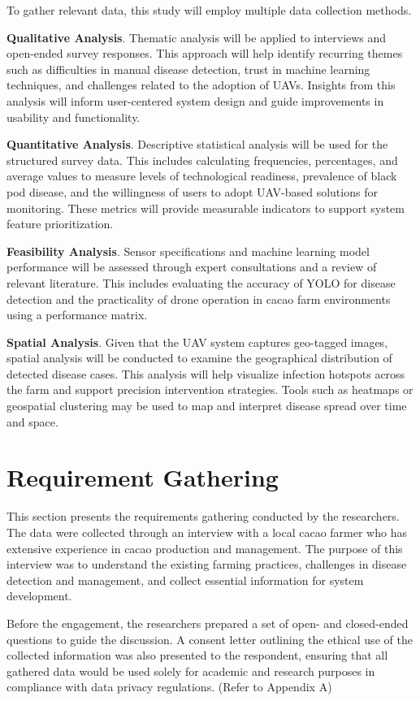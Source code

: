 To gather relevant data, this study will employ multiple data collection methods.

\textbf{Qualitative Analysis}. Thematic analysis will be applied to interviews and open-ended survey responses. This approach will help identify recurring themes such as difficulties in manual disease detection, trust in machine learning techniques, and challenges related to the adoption of UAVs. Insights from this analysis will inform user-centered system design and guide improvements in usability and functionality.

\textbf{Quantitative Analysis}. Descriptive statistical analysis will be used for the structured survey data. This includes calculating frequencies, percentages, and average values to measure levels of technological readiness, prevalence of black pod disease, and the willingness of users to adopt UAV-based solutions for monitoring. These metrics will provide measurable indicators to support system feature prioritization.


\textbf{Feasibility Analysis}. Sensor specifications and machine learning model performance will be assessed through expert consultations and a review of relevant literature. This includes evaluating the accuracy of YOLO for disease detection and the practicality of drone operation in cacao farm environments using a performance matrix.

\textbf{Spatial Analysis}. Given that the UAV system captures geo-tagged images, spatial analysis will be conducted to examine the geographical distribution of detected disease cases. This analysis will help visualize infection hotspots across the farm and support precision intervention strategies. Tools such as heatmaps or geospatial clustering may be used to map and interpret disease spread over time and space.

\section{Requirement Gathering}

This section presents the requirements gathering conducted by the researchers. The data were collected through an interview with a local cacao farmer who has extensive experience in cacao production and management. The purpose of this interview was to understand the existing farming practices, challenges in disease detection and management, and collect essential information for system development. 

Before the engagement, the researchers prepared a set of open- and closed-ended questions to guide the discussion. A consent letter outlining the ethical use of the collected information was also presented to the respondent, ensuring that all gathered data would be used solely for academic and research purposes in compliance with data privacy regulations. (Refer to Appendix A) 

